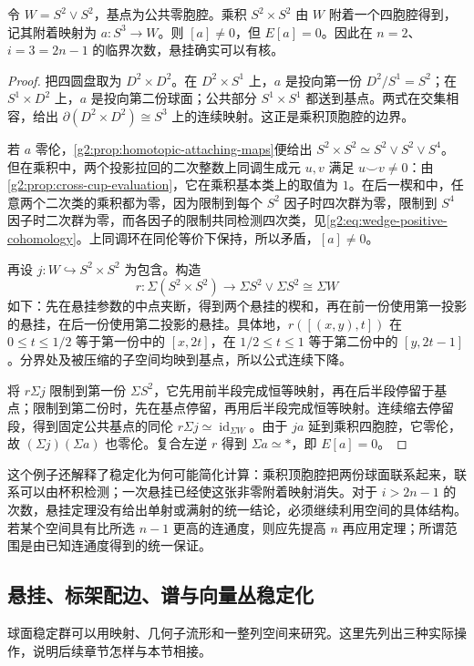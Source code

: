 \begin{example}\label{g2:exm:critical-suspension-kernel}
	令 \(W=S^2\vee S^2\)，基点为公共零胞腔。乘积 \(S^2\times S^2\) 由 \(W\) 附着一个四胞腔得到，记其附着映射为 \(a:S^3\rightarrow W\)。则 \([a]\ne0\)，但 \(E[a]=0\)。因此在 \(n=2\)、\(i=3=2n-1\) 的临界次数，悬挂确实可以有核。
\end{example}
\begin{proof}
	把四圆盘取为 \(D^2\times D^2\)。在 \(D^2\times S^1\) 上，\(a\) 是投向第一份 \(D^2/S^1=S^2\)；在 \(S^1\times D^2\) 上，\(a\) 是投向第二份球面；公共部分 \(S^1\times S^1\) 都送到基点。两式在交集相容，给出 \(\partial(D^2\times D^2)\cong S^3\) 上的连续映射。这正是乘积顶胞腔的边界。

	若 \(a\) 零伦，\cref{g2:prop:homotopic-attaching-maps}便给出 \(S^2\times S^2\simeq S^2\vee S^2\vee S^4\)。但在乘积中，两个投影拉回的二次整数上同调生成元 \(u,v\) 满足 \(u\smile v\ne0\)：由\cref{g2:prop:cross-cup-evaluation}，它在乘积基本类上的取值为 \(1\)。在后一楔和中，任意两个二次类的乘积都为零，因为限制到每个 \(S^2\) 因子时四次群为零，限制到 \(S^4\) 因子时二次群为零，而各因子的限制共同检测四次类，见\eqref{g2:eq:wedge-positive-cohomology}。上同调环在同伦等价下保持，所以矛盾，\([a]\ne0\)。

	再设 \(j:W\hookrightarrow S^2\times S^2\) 为包含。构造
	\[
		r:\Sigma(S^2\times S^2)\longrightarrow\Sigma S^2\vee\Sigma S^2\cong\Sigma W
	\]
	如下：先在悬挂参数的中点夹断，得到两个悬挂的楔和，再在前一份使用第一投影的悬挂，在后一份使用第二投影的悬挂。具体地，\(r([(x,y),t])\) 在 \(0\le t\le1/2\) 等于第一份中的 \([x,2t]\)，在 \(1/2\le t\le1\) 等于第二份中的 \([y,2t-1]\)。分界处及被压缩的子空间均映到基点，所以公式连续下降。

	将 \(r\Sigma j\) 限制到第一份 \(\Sigma S^2\)，它先用前半段完成恒等映射，再在后半段停留于基点；限制到第二份时，先在基点停留，再用后半段完成恒等映射。连续缩去停留段，得到固定公共基点的同伦 \(r\Sigma j\simeq\operatorname{id}_{\Sigma W}\)。由于 \(ja\) 延到乘积四胞腔，它零伦，故 \((\Sigma j)(\Sigma a)\) 也零伦。复合左逆 \(r\) 得到 \(\Sigma a\simeq*\)，即 \(E[a]=0\)。
\end{proof}

这个例子还解释了稳定化为何可能简化计算：乘积顶胞腔把两份球面联系起来，联系可以由杯积检测；一次悬挂已经使这张非零附着映射消失。对于 \(i>2n-1\) 的次数，悬挂定理没有给出单射或满射的统一结论，必须继续利用空间的具体结构。若某个空间具有比所选 \(n-1\) 更高的连通度，则应先提高 \(n\) 再应用定理；所谓范围是由已知连通度得到的统一保证。

\subsection{悬挂、标架配边、谱与向量丛稳定化}
\label{g2:subsec:0905:06}
球面稳定群可以用映射、几何子流形和一整列空间来研究。这里先列出三种实际操作，说明后续章节怎样与本节相接。

